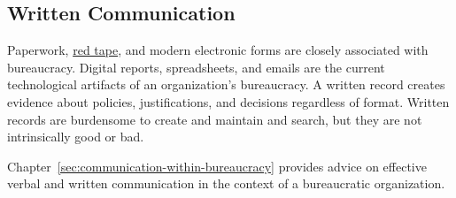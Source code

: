 \subsection*{Written Communication\label{sec:written-communication}}

Paperwork,  \href{https://en.wikipedia.org/wiki/Red_tape}{red tape},
and modern electronic forms are closely associated with bureaucracy.
Digital reports, spreadsheets, and emails are the current technological artifacts of an organization's bureaucracy. A written record creates evidence about policies, justifications, and decisions regardless of format. %
Written records are burdensome to create and maintain and search, but they are not intrinsically good or bad. 

Chapter~\ref{sec:communication-within-bureaucracy} 
provides advice on effective verbal and written communication in the context of a bureaucratic organization. 